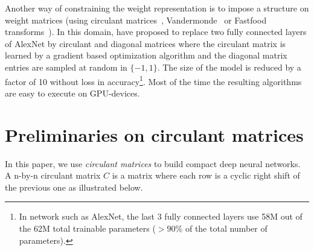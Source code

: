 Another way of constraining the weight representation is to impose a structure on weight matrices (\eg using circulant matrices~\cite{cheng,NIPS2015_5869}, Vandermonde~\cite{NIPS2015_5869} or Fastfood transforms~\cite{7410530}).
In this domain, \citet{cheng} have proposed to replace two fully connected layers of AlexNet by circulant and diagonal matrices where the circulant matrix is learned by a gradient based optimization algorithm and the diagonal matrix entries are sampled at random in $\{-1, 1\}$. 
The size of the model is reduced by a factor of 10 without loss in accuracy\footnote{In network such as AlexNet, the last 3 fully connected layers use 58M out of the 62M total trainable parameters ($> 90\%$ of the total number of parameters).}.
Most of the time the resulting algorithms are easy to execute on GPU-devices. 

\section{Preliminaries on circulant matrices}
\label{section:ch4-circ}


In this paper, we use \emph{circulant matrices} to build compact deep neural networks.
A n-by-n circulant matrix $C$ is a matrix where each row is a cyclic right shift of the previous one as illustrated below.



